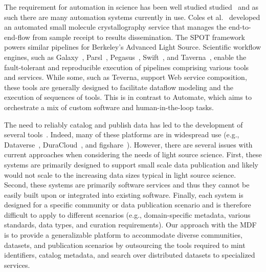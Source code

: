 \documentclass{aip-cp}
\newcommand\ian[1]{}
\newcommand\ryan[1]{}
\newcommand\ian[1]{{\color{red}[Ian: #1]}}
\newcommand\ryan[1]{{\color{green}[Ryan: #1]}}
\begin{document}
\ryan{Might need something about outsourcing.}

The requirement for automation in science has been well studied
studied~\cite{king2009automation, deslippe2014workflow, chard17ripple} and 
as such there are many automation systems currently in use. Coles et 
al.~\cite{coles2005ecses,coles2006science} developed an automated small molecule crystallography 
service that manages the end-to-end-flow from sample receipt to results dissemination. 
The SPOT framework~\cite{deslippe2014workflow} powers similar pipelines for Berkeley's Advanced 
Light Source. Scientific workflow engines, such as Galaxy~\cite{galaxy}, Parsl~\cite{parsl}, 
Pegasus~\cite{pegasus}, Swift~\cite{wilde2011swift}, and Taverna~\cite{taverna},
enable the fault-tolerant and reproducible execution of pipelines comprising various tools and 
services. While some, such as Teverna, support Web service composition, these tools are generally 
designed to facilitate dataflow modeling and the execution of sequences of tools. This is in 
contrast to Automate, which aims to orchestrate a mix of custom software and human-in-the-loop 
tasks.

\ian{PNNL work~\cite{thomas2015towards}. Helmholtz work~\cite{gehrke2015high}.}

The need to reliably catalog and publish data has led to the development of several 
tools~\cite{chard2015publication,wilkinson16,costello09pub}. Indeed, many of these platforms are 
in widespread use (e.g., Dataverse~\cite{dataverse}, DuraCloud~\cite{duracloud}, and 
figshare~\cite{figshare}).
However, there are several issues with current approaches when considering the needs
of light source science. First, these systems are primarily designed to support small
scale data publication and likely would not scale to the increasing data sizes
typical in light source science. Second, these systems are primarily software services
and thus they cannot be easily built upon or integrated into existing software. Finally, 
each system is designed for a specific community or data publication scenario and is
therefore difficult to apply to different 
scenarios (e.g., domain-specific metadata, various standards, data types, and 
curation requirements).  
Our approach 
with the MDF is to provide a generalizable platform to accommodate diverse communities, datasets, 
and publication scenarios by outsourcing the tools required to mint identifiers, catalog metadata, 
and search over distributed datasets to specialized services.
\end{document}
